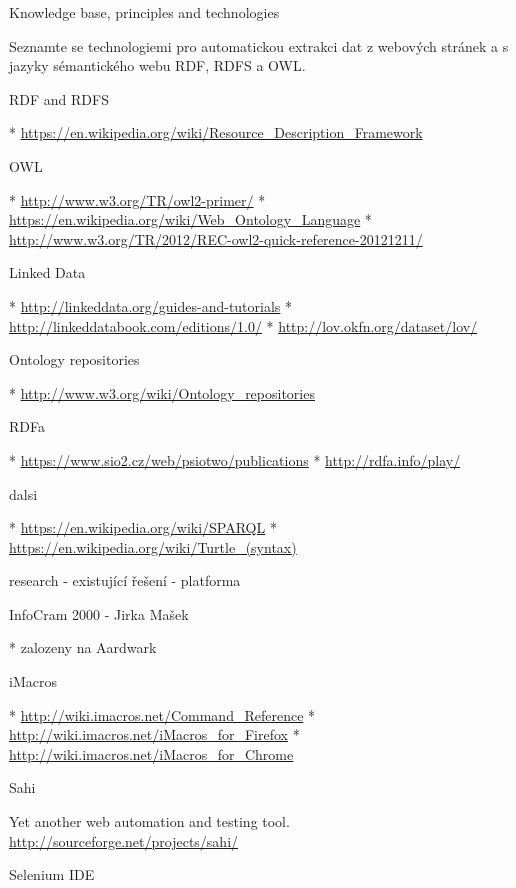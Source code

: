 \chap Knowledge base, principles and technologies

Seznamte se technologiemi pro automatickou extrakci dat z webových stránek a s
jazyky sémantického webu RDF, RDFS a OWL.


\sec RDF and RDFS

\begitems
 * \url{https://en.wikipedia.org/wiki/Resource_Description_Framework}
\enditems


\sec OWL

\begitems
 * \url{http://www.w3.org/TR/owl2-primer/}
 * \url{https://en.wikipedia.org/wiki/Web_Ontology_Language}
 * \url{http://www.w3.org/TR/2012/REC-owl2-quick-reference-20121211/}
\enditems


\sec Linked Data

\begitems
 * \url{http://linkeddata.org/guides-and-tutorials}
 * \url{http://linkeddatabook.com/editions/1.0/}
 * \url{http://lov.okfn.org/dataset/lov/}
\enditems


\sec Ontology repositories

\begitems
 * \url{http://www.w3.org/wiki/Ontology_repositories}
\enditems


\sec RDFa

\begitems
 * \url{https://www.sio2.cz/web/psiotwo/publications}
 * \url{http://rdfa.info/play/}
\enditems


\sec dalsi

\begitems
 * \url{https://en.wikipedia.org/wiki/SPARQL}
 * \url{https://en.wikipedia.org/wiki/Turtle_(syntax)}
\enditems







\chap research - existující řešení - platforma


\sec InfoCram 2000 - Jirka Mašek

\begitems
  * zalozeny na Aardwark 
\enditems


\sec iMacros

\begitems
  * \url{http://wiki.imacros.net/Command_Reference}
  * \url{http://wiki.imacros.net/iMacros_for_Firefox}
  * \url{http://wiki.imacros.net/iMacros_for_Chrome}
\enditems


\sec Sahi

Yet another web automation and testing tool. \url{http://sourceforge.net/projects/sahi/}


\sec Selenium IDE

